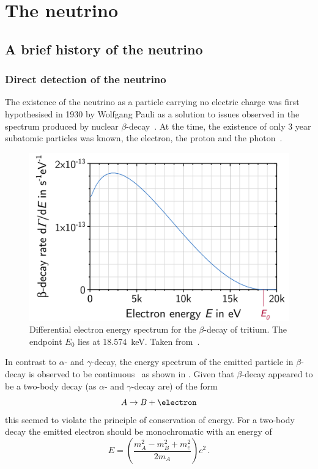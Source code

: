 \chapter{The neutrino}
\label{sec:theory}

\section{A brief history of the neutrino}
\label{sec:theory:history}

\subsection{Direct detection of the neutrino}
\label{sec:theory:history:detection}

The existence of the neutrino as a particle carrying no electric charge was first hypothesised in 1930 by Wolfgang Pauli as a solution to issues observed in the spectrum produced by nuclear $\beta$-decay~\cite{pauliNeutrino}.
At the time, the existence of only 3 year subatomic particles was known, the electron, the proton and the photon~\cite{ideaOfNeutrino}.

\begin{figure}[h]
  \centering
  \includegraphics[width=.7\linewidth]{files/figures/theory/betaDecaySpectrum}
  \caption{Differential electron energy spectrum for the $\beta$-decay of tritium. The endpoint $E_{0}$ lies at 18.574~keV. Taken from~\cite{betaDecay}.}
  \label{fig:betaDecay}
\end{figure}

In contrast to $\alpha$- and $\gamma$-decay, the energy spectrum of the emitted particle in $\beta$-decay is observed to be continuous~\cite{ideaOfNeutrino} as shown in .
Given that $\beta$-decay appeared to be a two-body decay (as $\alpha$- and $\gamma$-decay are) of the form
\begin{equation}
  A \rightarrow B + \electron
\end{equation}
this seemed to violate the principle of conservation of energy.
For a two-body decay the emitted electron should be monochromatic with an energy of
\begin{equation}
  E = \left( \frac{m_{A}^{2} - m_{B}^{2} + m_{e}^{2}}{2 m_{A}} \right)c^{2} \, .
\end{equation}

